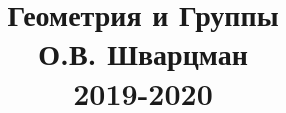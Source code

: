 \documentclass[fleqn]{article}
\title{Геометрия и Группы \\ О.В. Шварцман \\ 2019-2020}
\date{}
\begin{document}
	\maketitle
	\pagebreak	
	\tableofcontents
	
		
\end{document}
